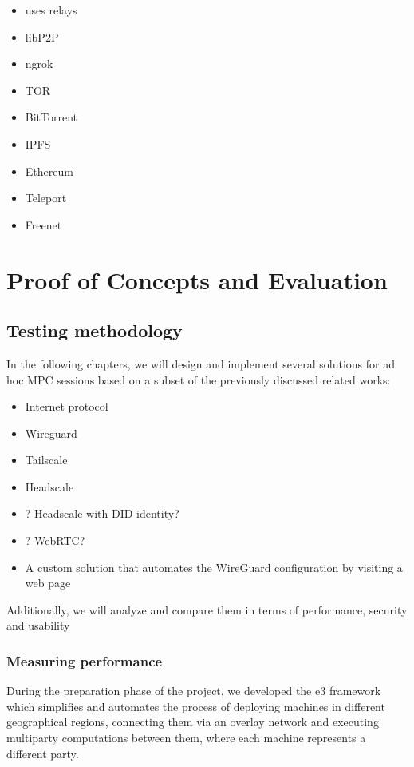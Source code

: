 \begin{itemize}
\item
  uses relays
\item
  libP2P
\item
  ngrok
\item
  TOR
\item
  BitTorrent
\item
  IPFS
\item
  Ethereum
\item
  Teleport
\item
  Freenet
\end{itemize}

\hypertarget{proof-of-concepts-and-evaluation}{%
\part{Proof of Concepts and
Evaluation}\label{proof-of-concepts-and-evaluation}}

\hypertarget{testing-methodology}{%
\chapter{Testing methodology}\label{testing-methodology}}

In the following chapters, we will design and implement several
solutions for ad hoc MPC sessions based on a subset of the previously
discussed related works:

\begin{itemize}
\tightlist
\item
  Internet protocol
\item
  Wireguard
\item
  Tailscale
\item
  Headscale
\item
  ? Headscale with DID identity?
\item
  ? WebRTC?
\item
  A custom solution that automates the WireGuard configuration by
  visiting a web page
\end{itemize}

Additionally, we will analyze and compare them in terms of performance,
security and usability

\hypertarget{measuring-performance}{%
\section{Measuring performance}\label{measuring-performance}}

During the preparation phase of the project, we developed the \gls{e3}
framework which simplifies and automates the process of deploying
machines in different geographical regions, connecting them via an
overlay network and executing multiparty computations between them,
where each machine represents a different party.

